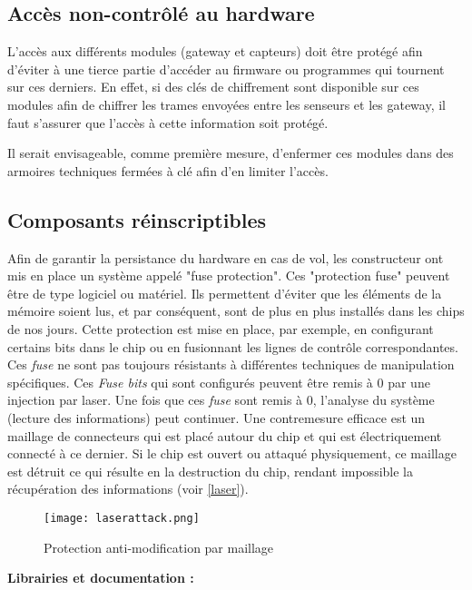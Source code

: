 \subsection{Accès non-contrôlé au hardware}
\label{ssec:cm-acceshardware}

L'accès aux différents modules (gateway et capteurs) doit être protégé afin d'éviter à une tierce partie d'accéder au firmware ou programmes qui tournent sur ces derniers. En effet, si des clés de chiffrement sont disponible sur ces modules afin de chiffrer les trames envoyées entre les senseurs et les gateway, il faut s'assurer que l'accès à cette information soit protégé.

Il serait envisageable, comme première mesure, d'enfermer ces modules dans des armoires techniques fermées à clé afin d'en limiter l'accès.

\subsection{Composants réinscriptibles}
\label{ssec:cm-fuse}

Afin de garantir la persistance du hardware en cas de vol, les constructeur ont mis en place un système appelé "fuse protection". Ces "protection fuse" peuvent être de type logiciel ou matériel. Ils permettent d'éviter que les éléments de la mémoire soient lus, et par conséquent, sont de plus en plus installés dans les chips de nos jours. Cette protection est mise en place, par exemple, en configurant certains bits dans le chip ou en fusionnant les lignes de contrôle correspondantes. Ces \textit{fuse} ne sont pas toujours résistants à différentes techniques de manipulation spécifiques. Ces \textit{Fuse bits} qui sont configurés peuvent être remis à 0 par une injection par laser. Une fois que ces \textit{fuse} sont remis à 0, l'analyse du système (lecture des informations) peut continuer. Une contremesure efficace est un maillage de connecteurs qui est placé autour du chip et qui est électriquement connecté à ce dernier. Si le chip est ouvert ou attaqué physiquement, ce maillage est détruit ce qui résulte en la destruction du chip, rendant impossible la récupération des informations (voir \autoref{laser}).

\begin{figure}[!h]
	\centering
	\texttt{[image: laserattack.png]}
	\caption{Protection anti-modification par maillage}
	\label{laser}
\end{figure}

\medskip
\textbf{Librairies et documentation :}


